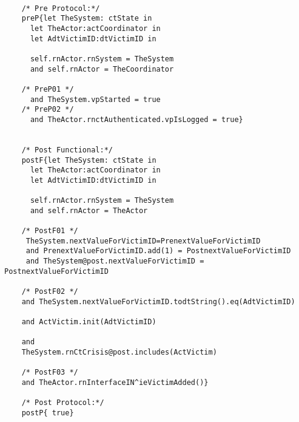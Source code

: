 	\scriptsize
	\vspace{0.5cm}
	\begin{lstlisting}[style=MessirStyle,firstnumber=auto,captionpos=b,caption={\msrmessir (MCL-oriented) specification of the operation \emph{oeAddVictim}.},label=OM-actCoordinator-oeAddVictim-MCL-LST]

	/* Pre Protocol:*/ 
	preP{let TheSystem: ctState in
	  let TheActor:actCoordinator in
	  let AdtVictimID:dtVictimID in
	  
	  self.rnActor.rnSystem = TheSystem
	  and self.rnActor = TheCoordinator
	  
	/* PreP01 */
	  and TheSystem.vpStarted = true
	/* PreP02 */
	  and TheActor.rnctAuthenticated.vpIsLogged = true}
	
	
	/* Post Functional:*/ 
	postF{let TheSystem: ctState in
	  let TheActor:actCoordinator in
	  let AdtVictimID:dtVictimID in
	  
	  self.rnActor.rnSystem = TheSystem
	  and self.rnActor = TheActor
	  
	/* PostF01 */
	 TheSystem.nextValueForVictimID=PrenextValueForVictimID
	 and PrenextValueForVictimID.add(1) = PostnextValueForVictimID
	 and TheSystem@post.nextValueForVictimID = PostnextValueForVictimID
	
	/* PostF02 */
	and TheSystem.nextValueForVictimID.todtString().eq(AdtVictimID)
	
	and ActVictim.init(AdtVictimID)
					   
	and 
	TheSystem.rnCtCrisis@post.includes(ActVictim)
	
	/* PostF03 */
	and TheActor.rnInterfaceIN^ieVictimAdded()}
	
	/* Post Protocol:*/ 
	postP{ true}
	
	\end{lstlisting}
	\normalsize 
	
	
	
	





